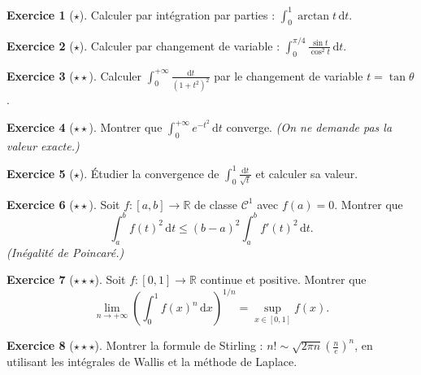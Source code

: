 \documentclass[12pt,a4paper,openany]{book}
\theoremstyle{definition}
\newtheorem{exercice}{Exercice}[chapter]
\newcommand{\R}{\mathbb{R}}
\newcommand{\dd}{\mathrm{d}}
\begin{document}
\begin{exercice}[$\star$]
  Calculer par intégration par parties : $\displaystyle\int_0^1 \arctan t\,\dd t$.
\end{exercice}

\begin{exercice}[$\star$]
  Calculer par changement de variable : $\displaystyle\int_0^{\pi/4}\frac{\sin t}{\cos^2 t}\,\dd t$.
\end{exercice}

\begin{exercice}[$\star\star$]
  Calculer $\displaystyle\int_0^{+\infty} \frac{\dd t}{(1+t^2)^2}$ par le changement de variable $t = \tan\theta$.
\end{exercice}

\begin{exercice}[$\star\star$]
  Montrer que $\displaystyle\int_0^{+\infty} e^{-t^2}\,\dd t$ converge. \emph{(On ne demande pas la valeur exacte.)}
\end{exercice}

\begin{exercice}[$\star$]
  Étudier la convergence de $\displaystyle\int_0^1\frac{\dd t}{\sqrt{t}}$ et calculer sa valeur.
\end{exercice}

\begin{exercice}[$\star\star$]
  Soit $f \colon [a,b] \to \R$ de classe $\mathcal{C}^1$ avec $f(a) = 0$. Montrer que
  \[
    \int_a^b f(t)^2\,\dd t \leqslant (b-a)^2 \int_a^b f'(t)^2\,\dd t.
  \]
  \emph{(Inégalité de Poincaré.)}
\end{exercice}

\begin{exercice}[$\star\star\star$]
  Soit $f \colon [0,1] \to \R$ continue et positive. Montrer que
  \[
    \lim_{n \to +\infty}\left(\int_0^1 f(x)^n\,\dd x\right)^{1/n} = \sup_{x \in [0,1]} f(x).
  \]
\end{exercice}

\begin{exercice}[$\star\star\star$]
  Montrer la formule de Stirling : $n! \sim \sqrt{2\pi n}\left(\frac{n}{e}\right)^n$, en utilisant les intégrales de Wallis et la méthode de Laplace.
\end{exercice}
\end{document}
